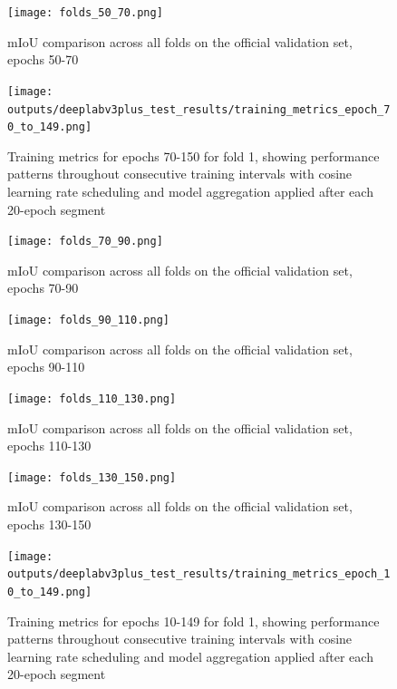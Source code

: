 \documentclass[]{article}
\begin{document}
\begin{figure}[htbp]
    \centering
    \texttt{[image: folds\_50\_70.png]}
    \caption{mIoU comparison across all folds on the official validation set, epochs 50-70}
    \label{fig:cross_val_50_70_val}
\end{figure}

\begin{figure}[htbp]
    \centering
    \texttt{[image: outputs/deeplabv3plus\_test\_results/training\_metrics\_epoch\_70\_to\_149.png]}
		\caption{Training metrics for epochs 70-150 for fold 1, showing performance patterns throughout consecutive training intervals with cosine learning rate scheduling and model aggregation applied after each 20-epoch segment}
    \label{fig:train_metrics_70_150}
\end{figure}

\begin{figure}[htbp]
		\centering
		\texttt{[image: folds\_70\_90.png]}
		\caption{mIoU comparison across all folds on the official validation set, epochs 70-90}
		\label{fig:cross_val_70_90_val}
\end{figure}

\begin{figure}[htbp]
		\centering
		\texttt{[image: folds\_90\_110.png]}
		\caption{mIoU comparison across all folds on the official validation set, epochs 90-110}
		\label{fig:cross_val_90_110_val}
\end{figure}

\begin{figure}[htbp]
		\centering
		\texttt{[image: folds\_110\_130.png]}
		\caption{mIoU comparison across all folds on the official validation set, epochs 110-130}
		\label{fig:cross_val_110_130_val}
\end{figure}

\begin{figure}[htbp]
		\centering
		\texttt{[image: folds\_130\_150.png]}
		\caption{mIoU comparison across all folds on the official validation set, epochs 130-150}
		\label{fig:cross_val_130_150_val}
\end{figure}

\begin{figure}[htbp]
		\centering
		\texttt{[image: outputs/deeplabv3plus\_test\_results/training\_metrics\_epoch\_10\_to\_149.png]}
		\caption{Training metrics for epochs 10-149 for fold 1, showing performance patterns throughout consecutive training intervals with cosine learning rate scheduling and model aggregation applied after each 20-epoch segment}
		\label{fig:train_metrics_10_149}
\end{figure}
\end{document}
